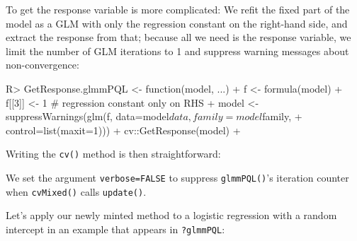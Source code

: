 \documentclass[
]{jss}
\begin{document}
To get the response variable is more complicated: We refit the fixed
part of the model as a GLM with only the regression constant on the
right-hand side, and extract the response from that; because all we need
is the response variable, we limit the number of GLM iterations to 1 and
suppress warning messages about non-convergence:

\begin{CodeChunk}
\begin{CodeInput}
R> GetResponse.glmmPQL <- function(model, ...){
+   f <- formula(model)
+   f[[3]] <- 1 # regression constant only on RHS
+   model <- suppressWarnings(glm(f, data=model$data, family=model$family,
+                                 control=list(maxit=1)))
+   cv::GetResponse(model)
+ }
\end{CodeInput}
\end{CodeChunk}

Writing the \texttt{cv()} method is then straightforward:

\begin{CodeChunk}
\end{CodeChunk}

We set the argument \texttt{verbose=FALSE} to suppress
\texttt{glmmPQL()}'s iteration counter when \texttt{cvMixed()} calls
\texttt{update()}.

Let's apply our newly minted method to a logistic regression with a
random intercept in an example that appears in \texttt{?glmmPQL}:
\end{document}
